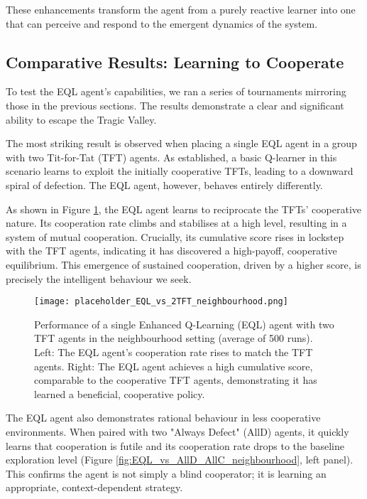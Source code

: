 \documentclass[]{llncs} %
\begin{document}
These enhancements transform the agent from a purely reactive learner into one that can perceive and respond to the emergent dynamics of the system.

\subsection{Comparative Results: Learning to Cooperate}

To test the EQL agent's capabilities, we ran a series of tournaments mirroring those in the previous sections. The results demonstrate a clear and significant ability to escape the Tragic Valley.

The most striking result is observed when placing a single EQL agent in a group with two Tit-for-Tat (TFT) agents. As established, a basic Q-learner in this scenario learns to exploit the initially cooperative TFTs, leading to a downward spiral of defection. The EQL agent, however, behaves entirely differently.

As shown in Figure \ref{fig:EQL_vs_TFT_neighbourhood}, the EQL agent learns to reciprocate the TFTs' cooperative nature. Its cooperation rate climbs and stabilises at a high level, resulting in a system of mutual cooperation. Crucially, its cumulative score rises in lockstep with the TFT agents, indicating it has discovered a high-payoff, cooperative equilibrium. This emergence of sustained cooperation, driven by a higher score, is precisely the intelligent behaviour we seek.

\begin{figure}[ht]
    \centering
    \texttt{[image: placeholder\_EQL\_vs\_2TFT\_neighbourhood.png]}
    \caption{Performance of a single Enhanced Q-Learning (EQL) agent with two TFT agents in the neighbourhood setting (average of 500 runs). Left: The EQL agent's cooperation rate rises to match the TFT agents. Right: The EQL agent achieves a high cumulative score, comparable to the cooperative TFT agents, demonstrating it has learned a beneficial, cooperative policy.}
    \label{fig:EQL_vs_TFT_neighbourhood}
\end{figure}

The EQL agent also demonstrates rational behaviour in less cooperative environments. When paired with two "Always Defect" (AllD) agents, it quickly learns that cooperation is futile and its cooperation rate drops to the baseline exploration level (Figure \ref{fig:EQL_vs_AllD_AllC_neighbourhood}, left panel). This confirms the agent is not simply a blind cooperator; it is learning an appropriate, context-dependent strategy.
\end{document}
